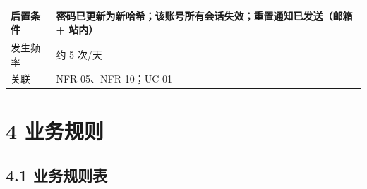 \documentclass[12pt,a4paper]{ctexart}
\begin{document}
{\begin{longtable}{|p{2.75cm}|p{13.25cm}|}
\hline
后置条件 & 密码已更新为新哈希；该账号所有会话失效；重置通知已发送（邮箱 + 站内） \\
\hline
发生频率 & 约 5 次/天 \\
\hline
关联 & NFR-05、NFR-10；UC-01 \\
\hline
\end{longtable}
}




\section*{4 业务规则}

\subsection*{4.1 业务规则表}
\end{document}

